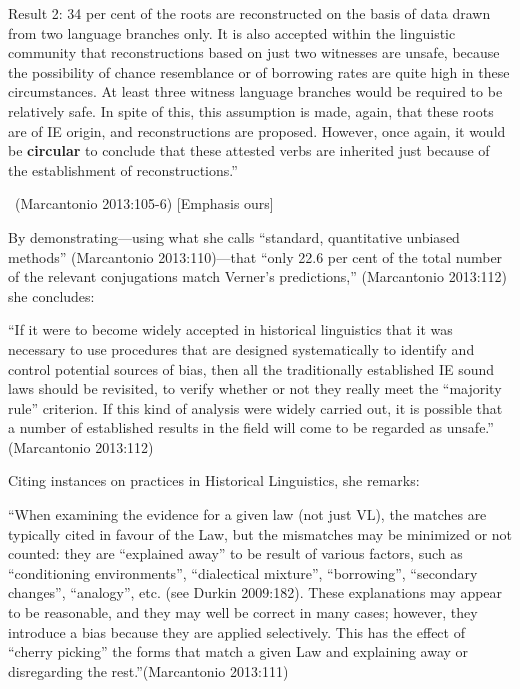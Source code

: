 \begin{myquote}
Result 2: 34 per cent of the roots are reconstructed on the basis of data drawn from two language branches only. It is also accepted within the linguistic community that reconstructions based on just two witnesses are unsafe, because the possibility of chance resemblance or of borrowing rates are quite high in these circumstances. At least three witness language branches would be required to be relatively safe. In spite of this, this assumption is made, again, that these roots are of IE origin, and reconstructions are proposed. However, once again, it would be \textbf{circular} to conclude that these attested verbs are inherited just because of the establishment of reconstructions.”

~\hfill (Marcantonio 2013:105-6) [Emphasis ours]
\end{myquote}

By demonstrating—using what she calls “standard, quantitative unbiased methods” (Marcantonio 2013:110)—that “only 22.6 per cent of the total number of the relevant conjugations match Verner’s predictions,” (Marcantonio 2013:112) she concludes:

\vskip 4pt

\begin{myquote}
“If it were to become widely accepted in historical linguistics that it was necessary to use procedures that are designed systematically to identify and control potential sources of bias, then all the traditionally established IE sound laws should be revisited, to verify whether or not they really meet the “majority rule” criterion. If this kind of analysis were widely carried out, it is possible that a number of established results in the field will come to be regarded as unsafe.” \hfill (Marcantonio 2013:112)
\end{myquote}

\vskip 4pt

Citing instances on practices in Historical Linguistics, she remarks:

\vskip 4pt

\begin{myquote}
“When examining the evidence for a given law (not just VL), the matches are typically cited in favour of the Law, but the mismatches may be minimized or not counted: they are “explained away” to be result of various factors, such as “conditioning environments”, “dialectical mixture”, “borrowing”, “secondary changes”, “analogy”, etc. (see Durkin 2009:182). These explanations may appear to be reasonable, and they may well be correct in many cases; however, they introduce a bias because they are applied selectively. This has the effect of “cherry picking” the forms that match a given Law and explaining away or disregarding the rest.”\hfill (Marcantonio 2013:111)
\end{myquote}

